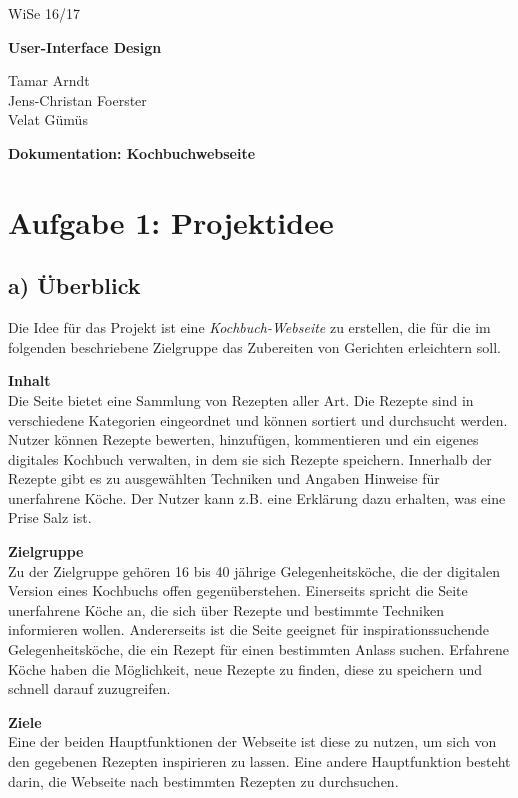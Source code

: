\documentclass[parskip,10pt,abstracton]{scrartcl}
\renewcommand*{\maketitle}{%
	\begin{flushright}
	{\rmfamily WiSe 16/17 \par}
	\end{flushright}
	\vspace{-1.3cm}
	
	{\bfseries\sffamily User-Interface Design} \\
	{\rmfamily Tamar Arndt \\ Jens-Christan Foerster \\ Velat Gümüs \par}
	
	{\centering\LARGE\sffamily\bfseries Dokumentation: Kochbuchwebseite \par}
	\vspace{1em}
}
\begin{document}
\maketitle

\section*{Aufgabe 1: Projektidee}

\subsection*{a) Überblick}

Die Idee für das Projekt ist eine \textit{Kochbuch-Webseite} zu erstellen, die für die im folgenden beschriebene Zielgruppe das Zubereiten von Gerichten erleichtern soll.

\textbf{Inhalt}\\
Die Seite bietet eine Sammlung von Rezepten aller Art.
Die Rezepte sind in verschiedene Kategorien eingeordnet und können sortiert und durchsucht werden.
Nutzer können Rezepte bewerten, hinzufügen, kommentieren und ein eigenes digitales Kochbuch verwalten, in dem sie sich Rezepte speichern.
Innerhalb der Rezepte gibt es zu ausgewählten Techniken und Angaben Hinweise für unerfahrene Köche. Der Nutzer kann z.B. eine Erklärung dazu erhalten, was eine Prise Salz ist.

\textbf{Zielgruppe}\\
Zu der Zielgruppe gehören 16 bis 40 jährige Gelegenheitsköche, die der digitalen Version eines Kochbuchs offen gegenüberstehen.
Einerseits spricht die Seite unerfahrene Köche an, die sich über Rezepte und bestimmte Techniken informieren wollen. Andererseits ist die Seite geeignet für inspirationssuchende Gelegenheitsköche, die ein Rezept für einen bestimmten Anlass suchen. Erfahrene Köche haben die Möglichkeit, neue Rezepte zu finden, diese zu speichern und schnell darauf zuzugreifen. 

\textbf{Ziele} \\
Eine der beiden Hauptfunktionen der Webseite ist diese zu nutzen, um sich von den gegebenen Rezepten inspirieren zu lassen. Eine andere Hauptfunktion besteht darin, die Webseite nach bestimmten Rezepten zu durchsuchen. 
\end{document}
